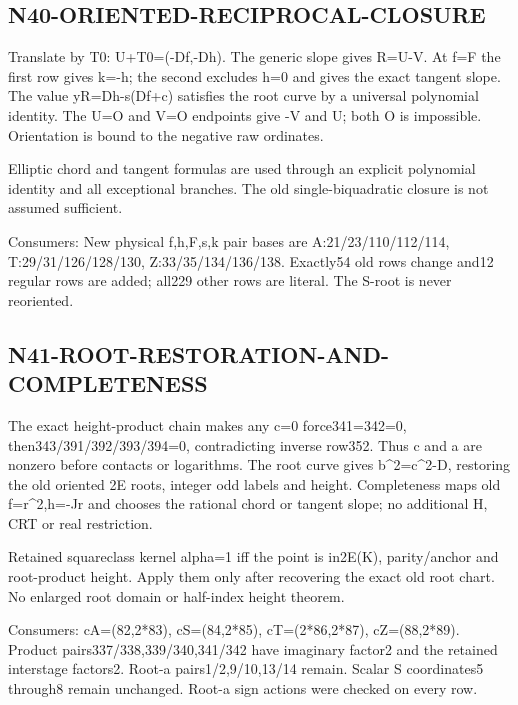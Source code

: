 \documentclass{article}
\begin{document}
\subsection{N40-ORIENTED-RECIPROCAL-CLOSURE}
\label{outline:r5-n40-oriented-reciprocal-closure}
Translate by T0: U+T0=(-Df,-Dh). The generic slope gives R=U-V. At f=F the first row gives k=-h; the second excludes h=0 and gives the exact tangent slope. The value yR=Dh-s(Df+c) satisfies the root curve by a universal polynomial identity. The U=O and V=O endpoints give -V and U; both O is impossible. Orientation is bound to the negative raw ordinates.
\par Elliptic chord and tangent formulas are used through an explicit polynomial identity and all exceptional branches. The old single-biquadratic closure is not assumed sufficient.
\par Consumers: New physical f,h,F,s,k pair bases are A:21/23/110/112/114, T:29/31/126/128/130, Z:33/35/134/136/138. Exactly54 old rows change and12 regular rows are added; all229 other rows are literal. The S-root is never reoriented.
\subsection{N41-ROOT-RESTORATION-AND-COMPLETENESS}
\label{outline:r5-n41-root-restoration-and-completeness}
The exact height-product chain makes any c=0 force341=342=0, then343/391/392/393/394=0, contradicting inverse row352. Thus c and a are nonzero before contacts or logarithms. The root curve gives b\textasciicircum{}2=c\textasciicircum{}2-D, restoring the old oriented 2E roots, integer odd labels and height. Completeness maps old f=r\textasciicircum{}2,h=-Jr and chooses the rational chord or tangent slope; no additional H, CRT or real restriction.
\par Retained squareclass kernel alpha=1 iff the point is in2E(K), parity/anchor and root-product height. Apply them only after recovering the exact old root chart. No enlarged root domain or half-index height theorem.
\par Consumers: cA=(82,2*83), cS=(84,2*85), cT=(2*86,2*87), cZ=(88,2*89). Product pairs337/338,339/340,341/342 have imaginary factor2 and the retained interstage factors2. Root-a pairs1/2,9/10,13/14 remain. Scalar S coordinates5 through8 remain unchanged. Root-a sign actions were checked on every row.
\end{document}
